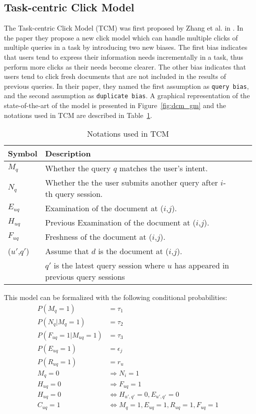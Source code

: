 \subsection{Task-centric Click Model}
\label{sec:methodology_tcm}
The Task-centric Click Model (TCM) was first proposed by Zhang et al. in \cite{Zhang2011}. In the paper they propose a new click model which can handle multiple clicks of multiple queries in a task by introducing two new biases. The first bias indicates that users tend to express their information needs incrementally in a task, thus perform more clicks as their needs become clearer. The other bias indicates that users tend to click fresh documents that are not included in the results of previous queries. In their paper, they named the first assumption as \texttt{query bias}, and the second assumption as \texttt{duplicate bias}. A graphical representation of the state-of-the-art of the model is presented in Figure~\ref{fig:dcm_gm} and the notations used in TCM are described in Table~\ref{table:tcm_notations}. 

\begin{table}[ht]
	\centering
	\begin{tabular}{l|lll|}
		\hline
		Symbol & Description \\
		\hline
		$M_q$			& Whether the query $q$ matches the user's intent.\\
		$N_q$ 			& Whether the the user submits another query after \(i\)-th query session.\\		
		$E_{uq}$ 		& Examination of the document at (\(i\),\(j\)).\\
		$H_{uq}$ 		& Previous Examination of the document at (\(i\),\(j\)).\\
		$F_{uq}$ 		& Freshness of the document at (\(i\),\(j\)).\\
		(\(u'\),\(q'\)) & Assume that \(d\) is the document at (\(i\),\(j\)).\\
		&\(q'\) is the latest query session where \(u\) has appeared in previous query sessions \\
		\hline
	\end{tabular}
	\caption{Notations used in TCM}
	\label{table:tcm_notations}
\end{table}

This model can be formalized with the following conditional probabilities:
\begin{align}
	P(M_q=1) &= \tau_1 \\
	\label{eq:alpha_2}
	P(N_q|M_q=1) &= \tau_2 \\
	P(F_{uq}=1|M_{uq}=1) &= \tau_3 \\
	P(E_{uq}=1) &= \epsilon_j \\
	P(R_{uq}=1) &= r_u \\
	M_q = 0 &\Rightarrow N_i = 1\\
	H_{uq} = 0 &\Rightarrow F_{uq} = 1\\
	H_{uq} = 0 &\Leftrightarrow H_{u',q'} = 0, E_{u',q'} = 0\\
	C_{uq} = 1 &\Leftrightarrow M_q = 1, E_{uq} = 1, R_{uq} = 1, F_{uq} = 1
\end{align}

